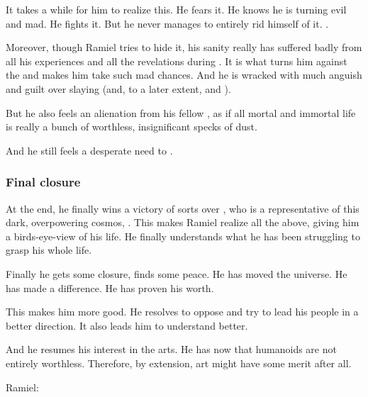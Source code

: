 It takes a while for him to realize this. 
He fears it. 
He knows he is turning evil and mad. 
He fights it. 
But he never manages to entirely rid himself of it. 
.

Moreover, though Ramiel tries to hide it, his sanity really has suffered badly from all his experiences and all the revelations during .
It is what turns him against the \banes and makes him take such mad chances.
And he is wracked with much anguish and guilt over slaying  (and, to a later extent,  and ).

But he also feels an alienation from his fellow \resphain, as if all mortal and immortal life is really a bunch of worthless, insignificant specks of dust.

And he still feels a desperate need to .






\subsubsection{Final closure}
At the end, he finally wins a victory of sorts over \Daggerrain, who is a representative of this dark, overpowering cosmos, . 
This makes Ramiel realize all the above, giving him a birds-eye-view of his life. 
He finally understands what he has been struggling to grasp his whole life. 

Finally he gets some closure, finds some peace. 
He has moved the universe. 
He has made a difference. 
He has proven his worth. 

This makes him more good. 
He resolves to oppose \Azraid{} and try to lead his people in a better direction. 
It also leads him to understand \Ishnaruchaefir{} better. 

And he resumes his interest in the arts. 
He has now  that humanoids are not entirely worthless. 
Therefore, by extension, art might have some merit after all. 

Ramiel: 










